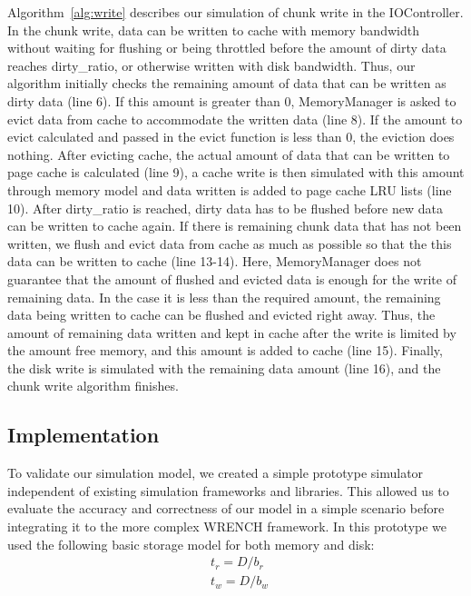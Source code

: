 \documentclass[conference]{IEEEtran}
\begin{document}
            Algorithm~\ref{alg:write} describes our simulation of chunk write in 
            the IOController. 
            In the chunk write, data can be written to cache with memory bandwidth 
            without waiting for flushing or being throttled before the amount of 
            dirty data reaches dirty\_ratio, or otherwise written with disk bandwidth.
            Thus, our algorithm initially checks the remaining amount of data that 
            can be written as dirty data (line 6).
            If this amount is greater than 0, MemoryManager is asked to evict 
            data from cache to accommodate the written data (line 8). 
            If the amount to evict calculated and passed in the evict function is less than 0, 
            the eviction does nothing.
            After evicting cache, the actual amount of data that can be written to 
            page cache is calculated (line 9), a cache write is then simulated 
            with this amount through memory model and data written is added to 
            page cache LRU lists (line 10).
            After dirty\_ratio is reached, dirty data has to be flushed before new data 
            can be written to cache again. 
            If there is remaining chunk data that has not been written, we flush and 
            evict data from cache as much as possible so that the this data can be 
            written to cache (line 13-14). 
            Here, MemoryManager does not guarantee that the amount of flushed 
            and evicted data is enough for the write of remaining data. 
            In the case it is less than the required amount, the remaining data 
            being written to cache can be flushed and evicted right away. 
            Thus, the amount of remaining data written and kept in cache 
            after the write is limited by the amount free memory, and this amount 
            is added to cache (line 15). 
            Finally, the disk write is simulated with the remaining data amount (line 16), 
            and the chunk write algorithm finishes.
            
        \subsection{Implementation}

            To validate our simulation model, we created a simple prototype
            simulator independent of existing simulation frameworks and libraries. 
            This allowed us to evaluate the accuracy and correctness of our 
            model in a simple scenario before integrating it to the more complex 
            WRENCH framework. 
            In this prototype we used the following basic storage model for 
            both memory and disk: 
            \begin{align*}
                & t_{r} = D / b_r \\ 
                & t_{w} = D / b_w\
            \end{align*}        
            
\end{document}
